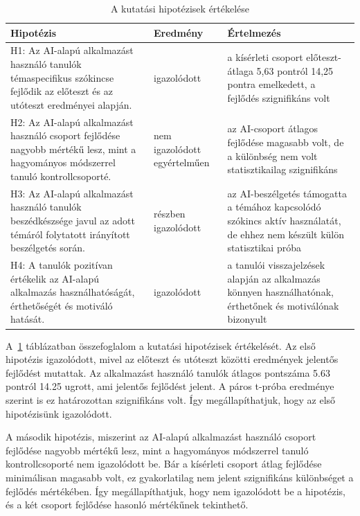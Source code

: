 \begin{table}[h!]
\centering
\begin{tabular}{p{6cm} p{3cm} p{6cm}}
\hline
\textbf{Hipotézis} & \textbf{Eredmény} & \textbf{Értelmezés} \\
\hline
H1: Az AI-alapú alkalmazást használó tanulók témaspecifikus szókincse fejlődik az előteszt és az utóteszt eredményei alapján. 
& igazolódott 
& a kísérleti csoport előteszt-átlaga 5,63 pontról 14,25 pontra emelkedett, a fejlődés szignifikáns volt \\
\hline
H2: Az AI-alapú alkalmazást használó csoport fejlődése nagyobb mértékű lesz, mint a hagyományos módszerrel tanuló kontrollcsoporté. 
& nem igazolódott egyértelműen 
& az AI-csoport átlagos fejlődése magasabb volt, de a különbség nem volt statisztikailag szignifikáns \\
\hline
H3: Az AI-alapú alkalmazást használó tanulók beszédkészsége javul az adott témáról folytatott irányított beszélgetés során. 
& részben igazolódott 
& az AI-beszélgetés támogatta a témához kapcsolódó szókincs aktív használatát, de ehhez nem készült külön statisztikai próba \\
\hline
H4: A tanulók pozitívan értékelik az AI-alapú alkalmazás használhatóságát, érthetőségét és motiváló hatását. 
& igazolódott 
& a tanulói visszajelzések alapján az alkalmazás könnyen használhatónak, érthetőnek és motiválónak bizonyult \\
\hline
\end{tabular}
\caption{A kutatási hipotézisek értékelése}
\label{tab:hipotezisek_ertekelese}
\end{table}

A~\ref{tab:hipotezisek_ertekelese} táblázatban összefoglalom a kutatási hipotézisek értékelését. Az első hipotézis igazolódott, mivel az előteszt és utóteszt közötti eredmények jelentős fejlődést mutattak. Az alkalmazást használó tanulók átlagos pontszáma 5.63 pontról 14.25 ugrott, ami jelentős fejlődést jelent. A páros t-próba eredménye szerint is ez határozottan szignifikáns volt. Így megállapíthatjuk, hogy az első hipotézisünk igazolódott.

A második hipotézis, miszerint az AI-alapú alkalmazást használó csoport fejlődése nagyobb mértékű lesz, mint a hagyományos módszerrel tanuló kontrollcsoporté nem igazolódott be. Bár a kísérleti csoport átlag fejlődése minimálisan magasabb volt, ez gyakorlatilag nem jelent szignifikáns különbséget a fejlődés mértékében. Így megállapíthatjuk, hogy nem igazolódott be a hipotézis, és a két csoport fejlődése hasonló mértékűnek tekinthető.


